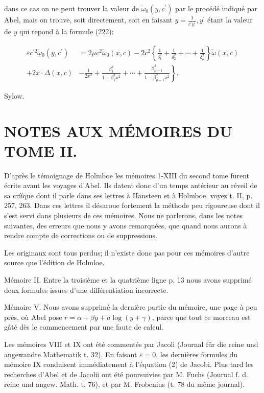 \documentclass{article}
\begin{document}
dans ce cas on ne peut trouver la valeur de \(\tilde{\omega}_{0}\left(y, c^{\prime}\right)\) par le procédé indiqué par Abel,
mais on trouve, soit directement, soit en faisant \(y=\frac{1}{c^{\prime} y^{\prime}}, y^{\prime}\) étant la valeur de \(y\) qui repond à la formule (222):

\[
\begin{aligned}
\varepsilon c^{\prime 2} \tilde{\omega}_{0}\left(y, c^{\prime}\right) & =2 \mu c^{2} \tilde{\omega}_{0}(x, c)-2 c^{2}\left\{\frac{1}{\delta_{1}^{2}}+\frac{1}{\delta_{2}^{2}}+\cdots+\frac{1}{\delta_{\mu}^{2}}\right\} \tilde{\omega}(x, c) \\
+2 x \cdot \Delta(x, c) & \left.-\frac{1}{2 x^{2}}+\frac{\beta_{1}^{2}}{1-\beta_{1}^{2} x^{2}}+\cdots+\frac{\beta_{\mu-1}^{2}}{1-\beta_{\mu-1}^{2} x^{2}}\right\} .
\end{aligned}
\]

Sylow.

\section*{NOTES AUX MÉMOIRES DU TOME II.}

D'après le témoignage de Holmboe les mémoires 1-XIII du second tome furent écrits avant les voyages d'Abel. Ils datent donc d'un temps antérieur au réveil de sa crííque dont il parle dans ses lettres à IIansteen et à Holmboe, voyez t. II, p. 257, 263. Dans ces lettres il désaroue fortement la méthode peu rigoureuse dont il s'est servi dans plusieurs de ces mémoires. Nous ne parlerons, dans les notes suivantes, des erreurs que nous y avons remarquées, que quand nous aurons à rendre compte de corrections ou de suppressions.

Les originaux sont tous perdus; il n'existe donc pas pour ces mémoires d'autre source que l'édition de Holmloe.

Mémoire II. Entre la troisième et la quatrième ligne p. 13 nous avons supprimé deux formules issues d'une différentiation incorrecte.

Mémoire V. Nous avons supprimé la dernière partie du mémoire, une page à peu près, où Abel pose \(r=\alpha+\beta y+a \log (y+\gamma)\), parce que tout ce morceau est gâté dès le commencement par une faute de calcul.

Les mémoires VIII et IX ont été commentés par Jacoli (Journal für die reine und angewandte Mathematik t. 32). En faisant \(\varepsilon=0\), les dernières formules du mémoire IX conduisent immédiatement à l'équation (2) de Jacobi. Plus tard les recherches d'Abel et de Jacolii ont été poursuivies par M. Fuchs (Journal f. d. reine und angew. Math. t. 76), et par M. Frobenius (t. 78 du même journal).
\end{document}
